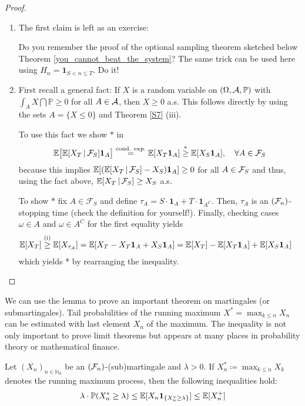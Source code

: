 \begin{proof}
	\begin{enumerate}[label=(\roman*)]	
		\item The first claim is left as an exercise:
		\begin{luebung}
		Do you remember the proof of the optional sampling theorem sketched below Theorem \ref{you_cannot_beat_the_system}? The same trick can be used here using $H_n = \mathbf 1_{S < n \leq T}$. Do it!
		\end{luebung}
		\item First recall a general fact: If $X$ is a random variable on $(\Omega,\mathcal{A},\mathbb{P})$ with $\int_A X \dint \mathbb{P} \geq 0$ for all $A \in \mathcal{A}$, then $X \geq 0 $ a.s. This follows directly by using the sets $A=\{X\leq 0\}$ and Theorem \ref{S7} (iii).\smallskip
		
		To use this fact we show $*$ in		
			\begin{align*}
				\mathbb{E}\big[ \mathbb{E}[ X_T\,|\,\mathcal{F}_S]\mathbf 1_A \big] \overset{\text{cond. exp.}}{=} \mathbb{E}[X_T \mathbf 1_A] \overset{*}{\geq} \mathbb{E}[X_S \mathbf 1_A],\quad \forall A \in \mathcal{F}_S
			\end{align*}
			because this implies $ \mathbb{E}[( \mathbb{E}[X_T\,|\,\mathcal{F}_S]-X_S )\mathbf 1_ A ] \geq 0$ for all $A \in \mathcal{F}_S$ and thus, using the fact above, $\mathbb{E} [X_T\,|\, \mathcal{F}_S]\geq X_S$ a.s.  \smallskip
			
			To show $*$ fix $A\in \mathcal F_S$ and define $\tau_A= S\cdot \mathbf 1_A+T\cdot  \mathbf 1_{A^C}$. Then, $\tau_A$ is an $(\mathcal{F}_n)$-stopping time (check the definition for yourself!). Finally, checking cases $\omega \in A$ and $\omega \in A^C$ for the first equality yields
			\begin{align*}
				\mathbb{E}[X_T] \overset{\text{(i)}}{\geq} \mathbb{E}[X_{\tau_A}] &= \mathbb{E}[X_T - X_T \mathbf 1_A + X_S  \mathbf 1_A] 
				= \mathbb{E}[X_T] - \mathbb{E}[X_T \mathbf 1_A] + \mathbb{E}[X_S \mathbf 1_A]
			\end{align*}
			which yields * by rearranging the inequality.
	\end{enumerate}
\end{proof}
We can use the lemma to prove an important theorem on martingales (or submartingales). Tail probabilities of the running maximum $X^*=\max_{k\leq n}X_n$ can be estimated with last element $X_n$ of the maximum. The inequality is not only important to prove limit theorems but appears at many places in probability theory or mathematical finance. 
\begin{lsatz}
\begin{theorem}\label{Doobs_inequality}
	Let $(X_n)_{n\in\mathbb{N}_0}$ be an $(\mathcal{F}_n)$-(sub)martingale and $\lambda > 0$. If $X_n^* \coloneqq \max_{k \leq n} X_k$ denotes the running maximum process, then the following inequalities hold:
	\begin{align*}
		\lambda \cdot \mathbb{P}(X_n^* \geq \lambda ) \leq \mathbb{E}[ X_n \mathbf 1_{\{X_n^* \geq \lambda\}}] \leq \mathbb{E}[X_n^+]
	\end{align*}
\end{theorem}
\end{lsatz}
